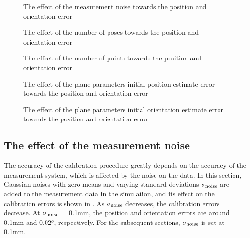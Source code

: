 \begin{figure}[t]
  \centering
  \caption{The effect of the measurement noise towards the position and orientation error} 
  \label{fig:laser_noise}
\end{figure}


\begin{figure}[t]
  \centering
  \caption{The effect of the number of poses towards the position and orientation error} 
  \label{fig:num_of_poses}
\end{figure}


\begin{figure}[t]
  \centering
  \caption{The effect of the number of points towards the position and orientation error} 
  \label{fig:num_of_points}
\end{figure}

\begin{figure}[t]
  \centering
  \caption{The effect of the plane parameters initial position estimate error towards the position and orientation error} 
  \label{fig:plane_params_linear}
\end{figure}

\begin{figure}[t]
  \centering
  \caption{The effect of the plane parameters initial orientation estimate error towards the position and orientation error} 
  \label{fig:plane_params_angular}
\end{figure}




\subsection{The effect of the measurement noise}
\label{sec:meas_accuracy}
The accuracy of the calibration procedure greatly depends on the accuracy of the measurement system, which is affected by the noise on the data. In this section, Gaussian noises with zero means and varying standard deviations $\sigma_{\rm{noise}}$ are added to the measurement data in the simulation, and its effect on the calibration errors is shown in . As $\sigma_{\rm{noise}}$ decreases, the calibration errors decrease. At $\sigma_{\rm{noise}}$ = 0.1mm, the position and orientation errors are around 0.1mm and 0.02$^o$, respectively. For the subsequent sections, $\sigma_{\rm{noise}}$ is set at 0.1mm. 

